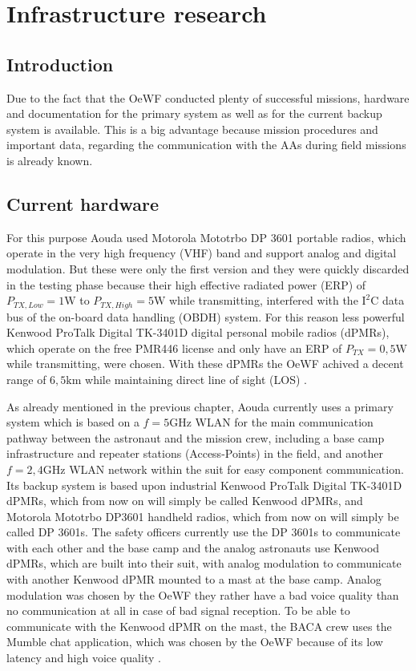 \chapter{Infrastructure research}

\section{Introduction}
Due to the fact that the OeWF conducted plenty of successful missions, hardware and documentation for the primary system as well as for the current backup system is available. This is a big advantage because mission procedures and important data, regarding the communication with the AAs during field missions is already known. 

\section{Current hardware}

For this purpose Aouda used Motorola Mototrbo DP 3601 portable radios, which operate in the very high frequency (VHF) band and support analog and digital modulation. But these were only the first version and they were quickly discarded in the testing phase because their high effective radiated power (ERP) of $P_{TX, Low} = 1\mathrm{W}$ to $P_{TX, High} = 5\mathrm{W}$ while transmitting, interfered with the $\mathrm{I^2C}$ data bus of the on-board data handling (OBDH) system. For this reason less powerful Kenwood ProTalk Digital TK-3401D digital personal mobile radios (dPMRs), which operate on the free PMR446 license and only have an ERP of $P_{TX} = 0,5\mathrm{W}$ while transmitting, were chosen. With these dPMRs the OeWF achived a decent range of $\mathrm{6,5km}$ while maintaining direct line of sight (LOS) \cite{DP3601:2010, Kenwood:2014, Groemer:2020}. 

As already mentioned in the previous chapter, Aouda currently uses a primary system which is based on a $f = 5\mathrm{GHz}$ WLAN for the main communication pathway between the astronaut and the mission crew, including a base camp infrastructure and repeater stations (Access-Points) in the field, and another $f = 2,4\mathrm{GHz}$ WLAN network within the suit for easy component communication. Its backup system is based upon industrial Kenwood ProTalk Digital TK-3401D dPMRs, which from now on will simply be called Kenwood dPMRs, and Motorola Mototrbo DP3601 handheld radios, which from now on will simply be called DP 3601s. The safety officers currently use the DP 3601s to communicate with each other and the base camp and the analog astronauts use Kenwood dPMRs, which are built into their suit, with analog modulation to communicate with another Kenwood dPMR mounted to a mast at the base camp. Analog modulation was chosen by the OeWF they rather have a bad voice quality than no communication at all in case of bad signal reception. To be able to communicate with the Kenwood dPMR on the mast, the BACA crew uses the Mumble chat application, which was chosen by the OeWF because of its low latency and high voice quality \cite{Mumble:2020}.

